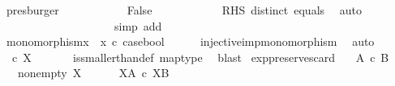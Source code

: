 \begin{isabellebody}
\ presburger\isanewline
\ \ \ \ \ \ \ \ \isamarkupfalse%
\ \isamarkupfalse%
\ False\isanewline
\ \ \ \ \ \ \ \ \ \ \isamarkupfalse%
\ RHS\ distinct\ equals\ \isamarkupfalse%
\ auto\isanewline
\ \ \ \ \ \ \isamarkupfalse%
\isanewline
\ \ \ \ \ \ \isamarkupfalse%
\ {\isachardoublequoteopen}{\isasymomega}{}\ {\isacharequal}{\kern0pt}\ {\isasymomega}{}{\isachardoublequoteclose}\isanewline
\ \ \ \ \ \ \ \ \isamarkupfalse%
\ {\isacharparenleft}{\kern0pt}simp\ add{\isacharcolon}{\kern0pt}\ {\isacartoucheopen}{\isasymomega}{}\ {\isacharequal}{\kern0pt}\ {\isasymf}{\isacartoucheclose}\ {\isacartoucheopen}{\isasymomega}{}\ {\isacharequal}{\kern0pt}\ {\isasymf}{\isacartoucheclose}{\isacharparenright}{\kern0pt}\isanewline
\ \ \ \ \isamarkupfalse%
\isanewline
\ \ \isamarkupfalse%
\isanewline
\ \ \isamarkupfalse%
\ \isamarkupfalse%
\ {\isachardoublequoteopen}monomorphism{\isacharparenleft}{\kern0pt}{\isacharparenleft}{\kern0pt}x{}\ {\isasymamalg}\ x{}{\isacharparenright}{\kern0pt}\ {\isasymcirc}\isactrlsub c\ case{\isacharunderscore}{\kern0pt}bool{\isacharparenright}{\kern0pt}{\isachardoublequoteclose}\isanewline
\ \ \ \ \isamarkupfalse%
\ injective{\isacharunderscore}{\kern0pt}imp{\isacharunderscore}{\kern0pt}monomorphism\ \isamarkupfalse%
\ auto\isanewline
\ \ \isamarkupfalse%
\ \isamarkupfalse%
\ {\isachardoublequoteopen}{\isasymOmega}\ {\isasymle}\isactrlsub c\ X{\isachardoublequoteclose}\isanewline
\ \ \ \ \isamarkupfalse%
\ \ is{\isacharunderscore}{\kern0pt}smaller{\isacharunderscore}{\kern0pt}than{\isacharunderscore}{\kern0pt}def\ map{\isacharunderscore}{\kern0pt}type\ \isamarkupfalse%
\ blast\isanewline
{}\isamarkupfalse%
%
\endisatagproof
{\isafoldproof}%
%
\isadelimproof
\isanewline
%
\endisadelimproof
\isanewline
{}\isamarkupfalse%
\ exp{\isacharunderscore}{\kern0pt}preserves{\isacharunderscore}{\kern0pt}card{}{\isacharcolon}{\kern0pt}\isanewline
\ \ \ {\isachardoublequoteopen}A\ {\isasymle}\isactrlsub c\ B{\isachardoublequoteclose}\isanewline
\ \ \ {\isachardoublequoteopen}nonempty\ X{\isachardoublequoteclose}\ \ \ \isanewline
\ \ \ {\isachardoublequoteopen}X\isactrlbsup A\isactrlesup \ {\isasymle}\isactrlsub c\ X\isactrlbsup B\isactrlesup {\isachardoublequoteclose}\isanewline

\end{isabellebody}
